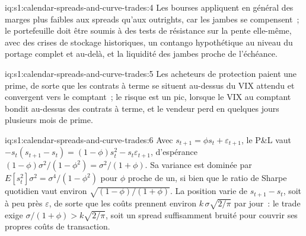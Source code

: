 \begin{solution}{iq:s1:calendar-spreads-and-curve-trades:4}
Les bourses appliquent en général des marges plus faibles aux spreads qu'aux outrights, car les jambes se compensent~; le portefeuille doit être soumis à des tests de résistance sur la pente elle-même, avec des crises de
stockage historiques, un contango hypothétique au niveau du portage complet et au-delà, et la liquidité des jambes proche de l'échéance.
\end{solution}

\begin{solution}{iq:s1:calendar-spreads-and-curve-trades:5}
Les acheteurs de protection paient une prime, de sorte que les contrats à terme se situent au-dessus du VIX attendu et convergent vers le comptant~; le risque est un pic, lorsque le VIX au comptant bondit au-dessus des
contrats à terme, et le vendeur perd en quelques jours plusieurs mois de prime.
\end{solution}

\begin{solution}{iq:s1:calendar-spreads-and-curve-trades:6}
Avec $s_{t+1} = \phi s_t + \varepsilon_{t+1}$, le P\&L vaut $-s_t(s_{t+1} - s_t) = (1 - \phi)s_t^2 - s_t\varepsilon_{t+1}$, d'espérance
$(1 - \phi)\sigma^2/(1 - \phi^2) = \sigma^2/(1 + \phi)$. Sa variance est dominée par $E[s_t^2]\sigma^2 = \sigma^4/(1 - \phi^2)$ pour $\phi$ proche de un, si bien que
le ratio de Sharpe quotidien vaut environ $\sqrt{(1 - \phi)/(1 + \phi)}$. La position varie de $s_{t+1} - s_t$, soit à peu près $\varepsilon$, de sorte que les coûts prennent environ $k\,
\sigma\sqrt{2/\pi}$ par jour~: le trade exige $\sigma/(1 + \phi) > k\sqrt{2/\pi}$, soit un spread suffisamment bruité pour couvrir ses propres coûts de transaction.
\end{solution}
